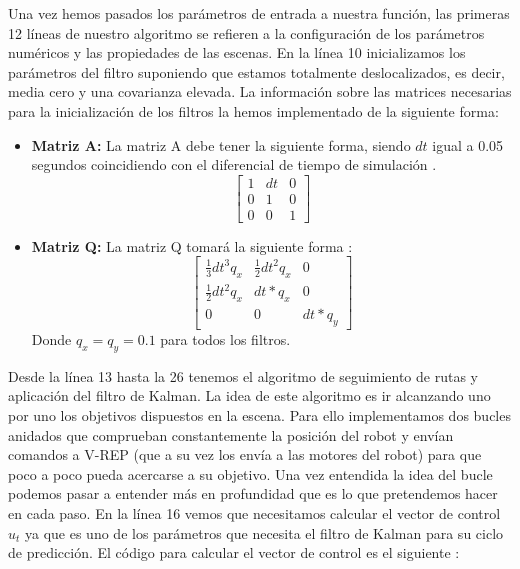 Una vez hemos pasados los parámetros de entrada a nuestra función, las primeras 12 líneas de nuestro algoritmo se refieren a la configuración de los parámetros numéricos y las propiedades de las escenas.
En la línea 10 inicializamos los parámetros del filtro suponiendo que estamos totalmente deslocalizados, es decir, media cero y una covarianza elevada.
La información sobre las matrices necesarias para la inicialización de los filtros la hemos implementado de la siguiente forma:
\begin{itemize}
\item \textbf{Matriz A:} La matriz A debe tener la siguiente forma, siendo $dt$ igual a 0.05 segundos coincidiendo con el diferencial de tiempo de simulación \cite{toolbox_simo}.
\begin{equation} \label{Ec:Matriz_A}
\begin{bmatrix}
    1 & dt & 0\\
    0 & 1 & 0 \\
    0 & 0 & 1 
\end{bmatrix}
\end{equation}
\item \textbf{Matriz Q:} La matriz Q tomará la siguiente forma \cite{toolbox_simo}:
\begin{equation} \label{Ec:Matriz_Q}
\begin{bmatrix}
    \frac{1}{3}dt^{3}q_{x} & \frac{1}{2}dt^{2}q_{x} & 0\\
    \frac{1}{2}dt^{2}q_{x} & dt*q_{x} & 0 \\
    0 & 0 & dt*q_{y} 
\end{bmatrix}
\end{equation}
Donde $q_x=q_y=0.1$ para todos los filtros.
\end{itemize}
Desde la línea 13 hasta la 26 tenemos el algoritmo de seguimiento de rutas y aplicación del filtro de Kalman.
La idea de este algoritmo es ir alcanzando uno por uno los objetivos dispuestos en la escena.
Para ello implementamos dos bucles anidados que comprueban constantemente la posición del robot y envían comandos a V-REP (que a su vez los envía a las motores del robot) para que poco a poco pueda acercarse a su objetivo.
Una vez entendida la idea del bucle podemos pasar a entender más en profundidad que es lo que pretendemos hacer en cada paso.
En la línea 16 vemos que necesitamos calcular el vector de control $u_t$ ya que es uno de los parámetros que necesita el filtro de Kalman para su ciclo de predicción.
El código para calcular el vector de control es el siguiente \cite{thrun_probabilistic_2005}:
